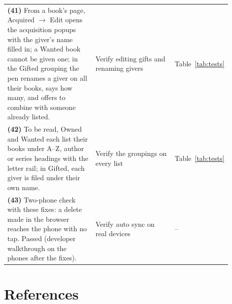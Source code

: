 \documentclass[12pt]{article}
\begin{document}
\begin{longtable}{L{0.4\linewidth} L{0.36\linewidth} L{0.14\linewidth}}
\textbf{(41)} From a book's page, Acquired $\rightarrow$ Edit opens the acquisition popups with the giver's name filled in; a Wanted book cannot be given one; in the Gifted grouping the pen renames a giver on all their books, says how many, and offers to combine with someone already listed. & Verify editing gifts and renaming givers & Table~\ref{tab:tests} \\
\textbf{(42)} To be read, Owned and Wanted each list their books under A--Z, author or series headings with the letter rail; in Gifted, each giver is filed under their own name. & Verify the groupings on every list & Table~\ref{tab:tests} \\
\textbf{(43)} Two-phone check with these fixes: a delete made in the browser reaches the phone with no tap. Passed (developer walkthrough on the phones after the fixes). & Verify auto sync on real devices & -- \\
\bottomrule
\end{longtable}

\section{References}
\end{document}
